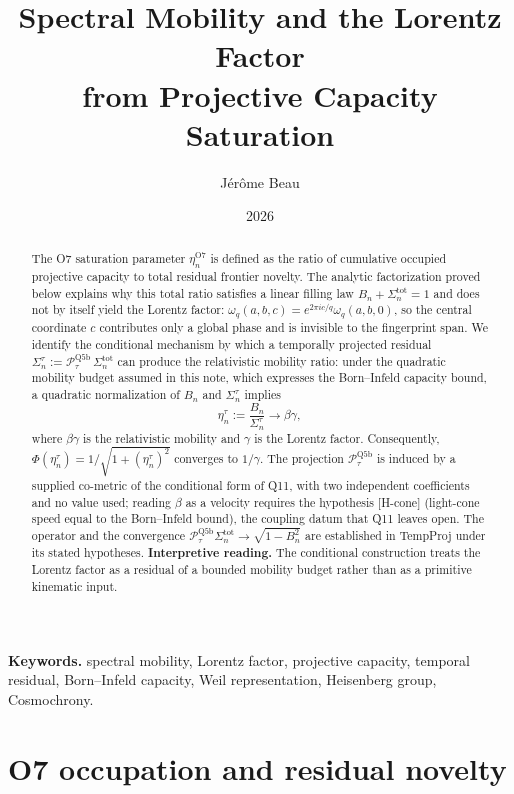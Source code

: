 \documentclass[11pt]{article}
\title{Spectral Mobility and the Lorentz Factor\\
from Projective Capacity Saturation}
\author{J\'er\^ome Beau}
\date{2026}
\begin{document}
  \maketitle

  \begin{abstract}
    The O7 saturation parameter $\eta_n^{\mathrm{O7}}$ is defined
    as the ratio of cumulative occupied projective capacity to total residual frontier novelty.
    The analytic factorization proved below explains why this total
    ratio satisfies a linear filling law $B_n + \Sigma_n^{\mathrm{tot}} = 1$ and does not
    by itself yield the Lorentz factor:
    $\omega_q(a,b,c) = e^{2\pi ic/q}\omega_q(a,b,0)$, so the central
    coordinate $c$ contributes only a global phase and is invisible to the fingerprint span.
    We identify the conditional mechanism by which a temporally projected residual
    $\Sigma_n^\tau := \mathcal{P}_\tau^{\mathrm{Q5b}}\,\Sigma_n^{\mathrm{tot}}$
    can produce the relativistic mobility ratio: under the
    quadratic mobility budget assumed in this note, which expresses the
    Born--Infeld capacity bound, a quadratic
    normalization of $B_n$ and $\Sigma_n^\tau$ implies
    \[
      \eta_n^\tau := \frac{B_n}{\Sigma_n^\tau} \longrightarrow \beta\gamma,
    \]
    where $\beta\gamma$ is the relativistic mobility and $\gamma$ is the Lorentz factor.
    Consequently, $\Phi(\eta_n^\tau) = 1/\sqrt{1+(\eta_n^\tau)^2}$ converges to $1/\gamma$.
    The projection $\mathcal{P}_\tau^{\mathrm{Q5b}}$ is induced by a supplied co-metric of the conditional form of
    Q11, with two independent coefficients and no value used; reading $\beta$ as a velocity requires the hypothesis
    [H-cone] (light-cone speed equal to the Born--Infeld bound), the coupling datum that Q11 leaves open.
    The operator and the convergence $\mathcal{P}_\tau^{\mathrm{Q5b}}\Sigma_n^{\mathrm{tot}}
    \to \sqrt{1-B_n^2}$ are established in TempProj under its stated hypotheses.
    \textbf{Interpretive reading.}
    The conditional construction treats the Lorentz factor as a residual of a bounded mobility
    budget rather than as a primitive kinematic input.
  \end{abstract}

  \noindent\textbf{Keywords.}
  spectral mobility, Lorentz factor, projective capacity, temporal residual,
  Born--Infeld capacity, Weil representation, Heisenberg group, Cosmochrony.

  \tableofcontents
  \newpage

  \section{O7 occupation and residual novelty}
    \label{sec:o7}
\end{document}
